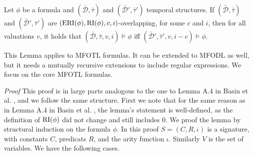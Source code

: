 \begin{lemma}
    \label{lem:eri-overlap}
    Let $\phi$ be a formula and $(\bar{\mathcal{D}}, \bar{\tau})$ and $(\bar{\mathcal{D}}', \bar{\tau}')$ temporal structures.
    If $(\bar{\mathcal{D}}, \bar{\tau})$ and $(\bar{\mathcal{D}}', \bar{\tau}')$ are $(\operatorname{ERI}(\phi), \operatorname{RI}(\phi), c, i)$-overlapping, for some $c$ and $i$, then for all valuations $v$, it holds that $(\bar{\mathcal{D}},\bar{\tau},v,i) \models \phi$ iff $(\bar{\mathcal{D}}', \bar{\tau}', v, i-c) \models \phi$.
\end{lemma}
This Lemma applies to MFOTL formulas.
It can be extended to MFODL as well, but it needs a mutually recursive extensions to include regular expressions.
We focus on the core MFOTL formulas.

\textit{Proof} This proof is in large parts analogous to the one to Lemma A.4 in Basin et al. \cite{Basin2016}, and we follow the same structure. First we note that for the same reason as in Lemma A.4 in Basin et al. \cite{Basin2016}, the lemma's statement is well-defined, as the definition of $\operatorname{RI}(\phi)$ did not change and still includes $0$.
We proof the lemma by structural induction on the formula $\phi$.
In this proof $S = (C, R, \iota)$ is a signature, with constants $C$, predicats $R$, and the arity function $\iota$.
Similarly $V$ is the set of variables.
We have the following cases.

